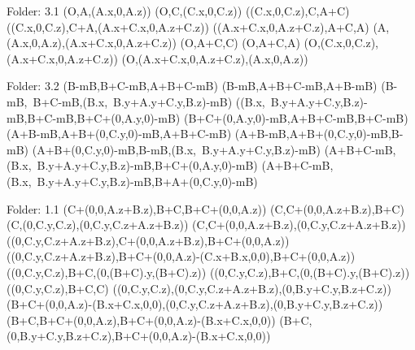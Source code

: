 Folder: 3.1
\left(O,A,\left(A.x,0,A.z\right)\right)
\left(O,C,\left(C.x,0,C.z\right)\right)
\left(\left(C.x,0,C.z\right),C,A+C\right)
\left(\left(C.x,0,C.z\right),C+A,\left(A.x+C.x,0,A.z+C.z\right)\right)
\left(\left(A.x+C.x,0,A.z+C.z\right),A+C,A\right)
\left(A,\left(A.x,0,A.z\right),\left(A.x+C.x,0,A.z+C.z\right)\right)
\left(O,A+C,C\right)
\left(O,A+C,A\right)
\left(O,\left(C.x,0,C.z\right),\left(A.x+C.x,0,A.z+C.z\right)\right)
\left(O,\left(A.x+C.x,0,A.z+C.z\right),\left(A.x,0,A.z\right)\right)

Folder: 3.2
\left(B-mB,B+C-mB,A+B+C-mB\right)
\left(B-mB,A+B+C-mB,A+B-mB\right)
\left(B-mB,\ B+C-mB,\left(B.x,\ B.y+A.y+C.y,B.z\right)-mB\right)
\left(\left(B.x,\ B.y+A.y+C.y,B.z\right)-mB,B+C-mB,B+C+\left(0,A.y,0\right)-mB\right)
\left(B+C+\left(0,A.y,0\right)-mB,A+B+C-mB,B+C-mB\right)
\left(A+B-mB,A+B+\left(0,C.y,0\right)-mB,A+B+C-mB\right)
\left(A+B-mB,A+B+\left(0,C.y,0\right)-mB,B-mB\right)
\left(A+B+\left(0,C.y,0\right)-mB,B-mB,\left(B.x,\ B.y+A.y+C.y,B.z\right)-mB\right)
\left(A+B+C-mB,\left(B.x,\ B.y+A.y+C.y,B.z\right)-mB,B+C+\left(0,A.y,0\right)-mB\right)
\left(A+B+C-mB,\left(B.x,\ B.y+A.y+C.y,B.z\right)-mB,B+A+\left(0,C.y,0\right)-mB\right)

Folder: 1.1
\left(C+\left(0,0,A.z+B.z\right),B+C,B+C+\left(0,0,A.z\right)\right)
\left(C,C+\left(0,0,A.z+B.z\right),B+C\right)
\left(C,\left(0,C.y,C.z\right),\left(0,C.y,C.z+A.z+B.z\right)\right)
\left(C,C+\left(0,0,A.z+B.z\right),\left(0,C.y,C.z+A.z+B.z\right)\right)
\left(\left(0,C.y,C.z+A.z+B.z\right),C+\left(0,0,A.z+B.z\right),B+C+\left(0,0,A.z\right)\right)
\left(\left(0,C.y,C.z+A.z+B.z\right),B+C+\left(0,0,A.z\right)-\left(C.x+B.x,0,0\right),B+C+\left(0,0,A.z\right)\right)
\left(\left(0,C.y,C.z\right),B+C,\left(0,\left(B+C\right).y,\left(B+C\right).z\right)\right)
\left(\left(0,C.y,C.z\right),B+C,\left(0,\left(B+C\right).y,\left(B+C\right).z\right)\right)
\left(\left(0,C.y,C.z\right),B+C,C\right)
\left(\left(0,C.y,C.z\right),\left(0,C.y,C.z+A.z+B.z\right),\left(0,B.y+C.y,B.z+C.z\right)\right)
\left(B+C+\left(0,0,A.z\right)-\left(B.x+C.x,0,0\right),\left(0,C.y,C.z+A.z+B.z\right),\left(0,B.y+C.y,B.z+C.z\right)\right)
\left(B+C,B+C+\left(0,0,A.z\right),B+C+\left(0,0,A.z\right)-\left(B.x+C.x,0,0\right)\right)
\left(B+C,\left(0,B.y+C.y,B.z+C.z\right),B+C+\left(0,0,A.z\right)-\left(B.x+C.x,0,0\right)\right)

